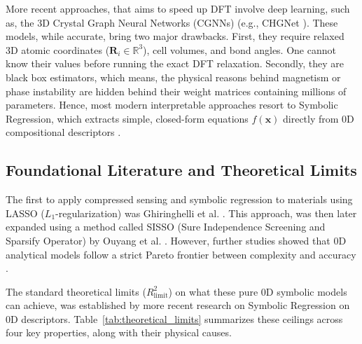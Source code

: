 \documentclass[12pt,onecolumn]{elsarticle}
\begin{document}
More recent approaches, that aims to speed up DFT involve deep learning, such as, the 3D Crystal Graph Neural Networks (CGNNs) (e.g., CHGNet \cite{chgnet}). These models, while accurate, bring two major drawbacks. First, they require relaxed 3D atomic coordinates ($\mathbf{R}_i \in \mathbb{R}^3$), cell volumes, and bond angles. One cannot know their values before running the exact DFT relaxation. Secondly, they are black box estimators, which means, the physical reasons behind magnetism or phase instability are hidden behind their weight matrices containing millions of parameters. Hence, most modern interpretable approaches resort to Symbolic Regression, which extracts simple, closed-form equations $f(\mathbf{x})$ directly from 0D compositional descriptors \cite{schmidt2009distilling, rissanen1978modeling}.

\subsection{Foundational Literature and Theoretical Limits}
The first to apply compressed sensing and symbolic regression to materials using LASSO ($L_1$-regularization) was Ghiringhelli et al. \cite{ghiringhelli2015bigdata}. This approach, was then later expanded using a method called SISSO (Sure Independence Screening and Sparsify Operator) by Ouyang et al. \cite{ouyang2018sisso}. However, further studies showed that 0D analytical models follow a strict Pareto frontier between complexity and accuracy \cite{rissanen1978modeling, ouyang2018sisso}.

The standard theoretical limits ($R^2_{\text{limit}}$) on what these pure 0D symbolic models can achieve, was established by more recent research on Symbolic Regression on 0D descriptors. Table~\ref{tab:theoretical_limits} summarizes these ceilings across four key properties, along with their physical causes.
\end{document}
